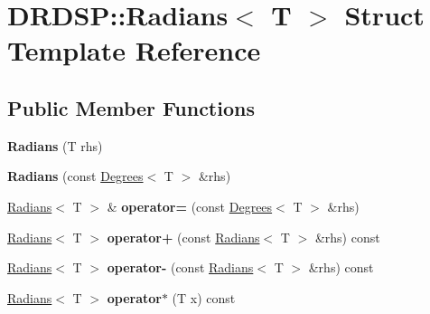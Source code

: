 \hypertarget{struct_d_r_d_s_p_1_1_radians}{\section{D\-R\-D\-S\-P\-:\-:Radians$<$ T $>$ Struct Template Reference}
\label{struct_d_r_d_s_p_1_1_radians}
}
\subsection*{Public Member Functions}
\begin{DoxyCompactItemize}
\item 
\hypertarget{struct_d_r_d_s_p_1_1_radians_a6d205398a16b398bb1c8025275247e83}{{\bfseries Radians} (T rhs)}\label{struct_d_r_d_s_p_1_1_radians_a6d205398a16b398bb1c8025275247e83}

\item 
\hypertarget{struct_d_r_d_s_p_1_1_radians_a271028672fbaf15e81300554dd983cbf}{{\bfseries Radians} (const \hyperlink{struct_d_r_d_s_p_1_1_degrees}{Degrees}$<$ T $>$ \&rhs)}\label{struct_d_r_d_s_p_1_1_radians_a271028672fbaf15e81300554dd983cbf}

\item 
\hypertarget{struct_d_r_d_s_p_1_1_radians_a88f574f0304ddb62637098b9e1c25eca}{\hyperlink{struct_d_r_d_s_p_1_1_radians}{Radians}$<$ T $>$ \& {\bfseries operator=} (const \hyperlink{struct_d_r_d_s_p_1_1_degrees}{Degrees}$<$ T $>$ \&rhs)}\label{struct_d_r_d_s_p_1_1_radians_a88f574f0304ddb62637098b9e1c25eca}

\item 
\hypertarget{struct_d_r_d_s_p_1_1_radians_a05111a27c968befc781af04b10028e22}{\hyperlink{struct_d_r_d_s_p_1_1_radians}{Radians}$<$ T $>$ {\bfseries operator+} (const \hyperlink{struct_d_r_d_s_p_1_1_radians}{Radians}$<$ T $>$ \&rhs) const }\label{struct_d_r_d_s_p_1_1_radians_a05111a27c968befc781af04b10028e22}

\item 
\hypertarget{struct_d_r_d_s_p_1_1_radians_a8c01c8f0c6551790d85e30cda27c3a95}{\hyperlink{struct_d_r_d_s_p_1_1_radians}{Radians}$<$ T $>$ {\bfseries operator-\/} (const \hyperlink{struct_d_r_d_s_p_1_1_radians}{Radians}$<$ T $>$ \&rhs) const }\label{struct_d_r_d_s_p_1_1_radians_a8c01c8f0c6551790d85e30cda27c3a95}

\item 
\hypertarget{struct_d_r_d_s_p_1_1_radians_ab9da690d7b68008ca17e05b2e6963715}{\hyperlink{struct_d_r_d_s_p_1_1_radians}{Radians}$<$ T $>$ {\bfseries operator$\ast$} (T x) const }\label{struct_d_r_d_s_p_1_1_radians_ab9da690d7b68008ca17e05b2e6963715}


\end{DoxyCompactItemize}
